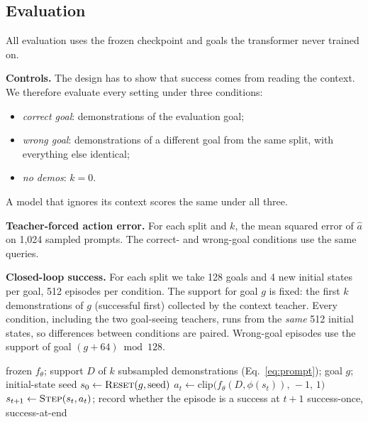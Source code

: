 \subsection{Evaluation}
\label{sec:eval}
All evaluation uses the frozen checkpoint and goals the transformer never trained on.

\textbf{Controls.} The design has to show that success comes from reading the context. We therefore evaluate every setting under
three conditions:
\begin{itemize}
  \item \emph{correct goal}: demonstrations of the evaluation goal;
  \item \emph{wrong goal}: demonstrations of a different goal from the same split, with everything else identical;
  \item \emph{no demos}: $k = 0$.
\end{itemize}
A model that ignores its context scores the same under all three.

\textbf{Teacher-forced action error.} For each split and $k$, the mean squared error of $\hat a$ on 1{,}024 sampled prompts.
The correct- and wrong-goal conditions use the same queries.

\textbf{Closed-loop success.} For each split we take 128 goals and 4 new initial states per goal, 512 episodes per condition. The
support for goal $g$ is fixed: the first $k$ demonstrations of $g$ (successful first) collected by the context teacher. Every
condition, including the two goal-seeing teachers, runs from the \emph{same} 512 initial states, so differences between conditions
are paired. Wrong-goal episodes use the support of goal $(g + 64) \bmod 128$.

\begin{algorithm}[h]
\caption{Closed-loop evaluation of one condition (vectorized over the 512 episodes in practice)}
\label{alg:closed-loop}
\begin{algorithmic}[1]
\Require frozen $f_\theta$; support $D$ of $k$ subsampled demonstrations (Eq.~\ref{eq:prompt}); goal $g$; initial-state seed
\State $s_0 \gets \textsc{Reset}(g, \text{seed})$ 
  \State $a_t \gets \mathrm{clip}\big(f_\theta(D, \phi(s_t)),\, -1,\, 1\big)$ 
  \State $s_{t+1} \gets \textsc{Step}(s_t, a_t)$; record whether the episode is a success at $t+1$
\EndFor
\State \Return success-once, success-at-end
\end{algorithmic}
\end{algorithm}

